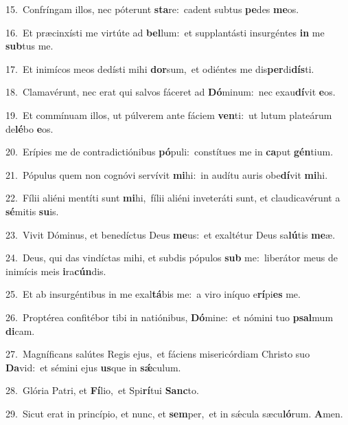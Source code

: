 {\numbfont\textcolor{\numbcolor}{15.}}~Confríngam illos, nec póterunt \textbf{sta}\-re:~\star cadent subtus \textbf{pe}\-des \textbf{me}\-os.\par
{\numbfont\textcolor{\numbcolor}{16.}}~Et præcinxísti me virtúte ad \textbf{bel}\-lum:~\star et supplantásti insurgéntes \textbf{in} me \textbf{sub}\-tus me.\par
{\numbfont\textcolor{\numbcolor}{17.}}~Et inimícos meos dedísti mihi \textbf{dor}\-sum,~\star et odiéntes me dis\-\textbf{per}\-di\-\textbf{dís}\-ti.\par
{\numbfont\textcolor{\numbcolor}{18.}}~Clamavérunt, nec erat qui salvos fáceret ad \textbf{Dó}\-minum:~\star nec exau\-\textbf{dí}\-vit \textbf{e}\-os.\par
{\numbfont\textcolor{\numbcolor}{19.}}~Et commínuam illos, ut púlverem ante fáciem \textbf{ven}\-ti:~\star ut lutum plateárum de\-\textbf{lé}\-bo \textbf{e}\-os.\par
{\numbfont\textcolor{\numbcolor}{20.}}~Erípies me de contradictiónibus \textbf{pó}\-puli:~\star constítues me in \textbf{ca}\-put \textbf{gén}\-tium.\par
{\numbfont\textcolor{\numbcolor}{21.}}~Pópulus quem non cognóvi servívit \textbf{mi}\-hi:~\star in audítu auris obe\-\textbf{dí}\-vit \textbf{mi}\-hi.\par
{\numbfont\textcolor{\numbcolor}{22.}}~Fílii aliéni mentíti sunt \textbf{mi}\-hi,~\star fílii aliéni inveteráti sunt, et claudicavérunt a \textbf{sé}\-mitis \textbf{su}\-is.\par
{\numbfont\textcolor{\numbcolor}{23.}}~Vivit Dóminus, et benedíctus Deus \textbf{me}\-us:~\star et exaltétur Deus sa\-\textbf{lú}\-tis \textbf{me}\-æ.\par
{\numbfont\textcolor{\numbcolor}{24.}}~Deus, qui das vindíctas mihi, et subdis pópulos \textbf{sub} me:~\star liberátor meus de inimícis meis \textbf{i}\-ra\-\textbf{cún}\-dis.\par
{\numbfont\textcolor{\numbcolor}{25.}}~Et ab insurgéntibus in me exal\-\textbf{tá}\-bis me:~\star a viro iníquo e\-\textbf{rí}\-pi\textbf{es} me.\par
{\numbfont\textcolor{\numbcolor}{26.}}~Proptérea confitébor tibi in natiónibus, \textbf{Dó}\-mine:~\star et nómini tuo \textbf{psal}\-mum \textbf{di}\-cam.\par
{\numbfont\textcolor{\numbcolor}{27.}}~Magníficans salútes Regis ejus,~\dagger et fáciens misericórdiam Christo suo \textbf{Da}\-vid:~\star et sémini ejus \textbf{us}\-que in \textbf{sǽ}\-culum.\par
{\numbfont\textcolor{\numbcolor}{28.}}~Glória Patri, et \textbf{Fí}\-lio,~\star et Spi\-\textbf{rí}\-tui \textbf{Sanc}\-to.\par
{\numbfont\textcolor{\numbcolor}{29.}}~Sicut erat in princípio, et nunc, et \textbf{sem}\-per,~\star et in sǽcula sæcu\-\textbf{ló}\-rum. \textbf{A}\-men.\par
